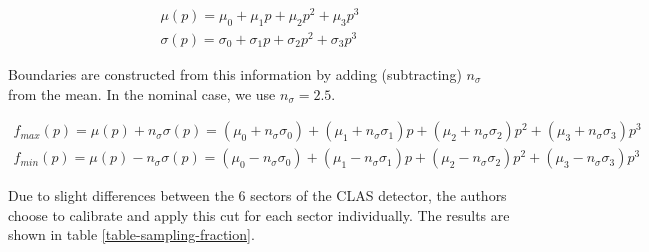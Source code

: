 \begin{eqnarray}
  \mu (p) = \mu_0 + \mu_1 p + \mu_2 p^2 + \mu_3 p^3 \\
  \sigma (p) = \sigma_0 + \sigma_1 p + \sigma_2 p^2 + \sigma_3 p^3 
\end{eqnarray}    

Boundaries are constructed from this information by adding (subtracting) $n_{\sigma}$ from the mean.  In the nominal case, we use $n_{\sigma} = 2.5$.

\begin{eqnarray}
  f_{max} (p) = \mu (p) + n_{\sigma} \sigma (p) = (\mu_0 + n_{\sigma} \sigma_0) + (\mu_1 + n_{\sigma} \sigma_1)p + (\mu_2 + n_{\sigma} \sigma_2)p^2 + (\mu_3 + n_{\sigma} \sigma_3)p^3 \\
  f_{min} (p) = \mu (p) - n_{\sigma} \sigma (p) = (\mu_0 - n_{\sigma} \sigma_0) + (\mu_1 - n_{\sigma} \sigma_1)p + (\mu_2 - n_{\sigma} \sigma_2)p^2 + (\mu_3 - n_{\sigma} \sigma_3)p^3
\end{eqnarray}

Due to slight differences between the 6 sectors of the CLAS detector, the authors choose to calibrate and apply this cut for each sector individually.  The results are shown in table \ref{table-sampling-fraction}.




